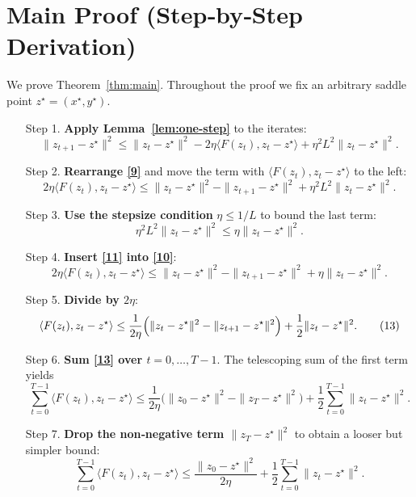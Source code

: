 \documentclass{article}
\begin{document}
\section*{Main Proof (Step‑by‑Step Derivation)}

We prove Theorem~\ref{thm:main}. Throughout the proof we fix an arbitrary saddle point
$z^{\star}=(x^{\star},y^{\star})$.

\begin{enumerate}
\item[Step 1.] \textbf{Apply Lemma~\ref{lem:one-step}} to the iterates:
\[
\|z_{t+1}-z^{\star}\|^{2}
\le
\|z_{t}-z^{\star}\|^{2}
-2\eta\langle F(z_{t}),z_{t}-z^{\star}\rangle
+\eta^{2}L^{2}\|z_{t}-z^{\star}\|^{2}.
\tag{9}
\]

\item[Step 2.] \textbf{Rearrange \eqref{9}} and move the term with $\langle F(z_{t}),z_{t}-z^{\star}\rangle$ to the left:
\[
2\eta\langle F(z_{t}),z_{t}-z^{\star}\rangle
\le
\|z_{t}-z^{\star}\|^{2}-\|z_{t+1}-z^{\star}\|^{2}
+\eta^{2}L^{2}\|z_{t}-z^{\star}\|^{2}.
\tag{10}
\]

\item[Step 3.] \textbf{Use the stepsize condition} $\eta\le1/L$ to bound the last term:
\[
\eta^{2}L^{2}\|z_{t}-z^{\star}\|^{2}\le\eta\|z_{t}-z^{\star}\|^{2}.
\tag{11}
\]

\item[Step 4.] \textbf{Insert \eqref{11} into \eqref{10}}:
\[
2\eta\langle F(z_{t}),z_{t}-z^{\star}\rangle
\le
\|z_{t}-z^{\star}\|^{2}-\|z_{t+1}-z^{\star}\|^{2}
+\eta\|z_{t}-z^{\star}\|^{2}.
\tag{12}
\]

\item[Step 5.] \textbf{Divide by $2\eta$}:
\[
\langle F(z_{t}),z_{t}-z^{\star}\rangle
\le
\frac{1}{2\eta}\Bigl(\|z_{t}-z^{\star}\|^{2}-\|z_{t+1}-z^{\star}\|^{2}\Bigr)
+\frac{1}{2}\|z_{t}-z^{\star}\|^{2}.
\tag{13}
\]

\item[Step 6.] \textbf{Sum \eqref{13} over $t=0,\dots,T-1$}.
The telescoping sum of the first term yields
\[
\sum_{t=0}^{T-1}\langle F(z_{t}),z_{t}-z^{\star}\rangle
\le
\frac{1}{2\eta}\bigl(\|z_{0}-z^{\star}\|^{2}-\|z_{T}-z^{\star}\|^{2}\bigr)
+\frac{1}{2}\sum_{t=0}^{T-1}\|z_{t}-z^{\star}\|^{2}.
\tag{14}
\]

\item[Step 7.] \textbf{Drop the non‑negative term $\|z_{T}-z^{\star}\|^{2}$} to obtain a looser but simpler bound:
\[
\sum_{t=0}^{T-1}\langle F(z_{t}),z_{t}-z^{\star}\rangle
\le
\frac{\|z_{0}-z^{\star}\|^{2}}{2\eta}
+\frac{1}{2}\sum_{t=0}^{T-1}\|z_{t}-z^{\star}\|^{2}.
\tag{15}
\]


\end{enumerate}
\end{document}
